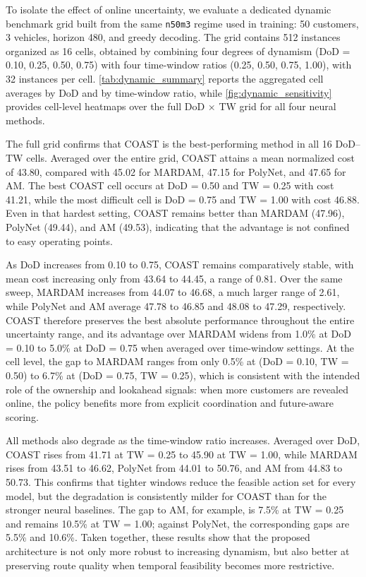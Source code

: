 \documentclass[conference]{IEEEtran}
\begin{document}
To isolate the effect of online uncertainty, we evaluate a dedicated dynamic benchmark grid built from the same \texttt{n50m3} regime used in training: 50 customers, 3 vehicles, horizon 480, and greedy decoding. The grid contains 512 instances organized as 16 cells, obtained by combining four degrees of dynamism (DoD = 0.10, 0.25, 0.50, 0.75) with four time-window ratios (0.25, 0.50, 0.75, 1.00), with 32 instances per cell. \autoref{tab:dynamic_summary} reports the aggregated cell averages by DoD and by time-window ratio, while \autoref{fig:dynamic_sensitivity} provides cell-level heatmaps over the full DoD $\times$ TW grid for all four neural methods.

The full grid confirms that COAST is the best-performing method in all 16 DoD--TW cells. Averaged over the entire grid, COAST attains a mean normalized cost of 43.80, compared with 45.02 for MARDAM, 47.15 for PolyNet, and 47.65 for AM. The best COAST cell occurs at DoD = 0.50 and TW = 0.25 with cost 41.21, while the most difficult cell is DoD = 0.75 and TW = 1.00 with cost 46.88. Even in that hardest setting, COAST remains better than MARDAM (47.96), PolyNet (49.44), and AM (49.53), indicating that the advantage is not confined to easy operating points.

As DoD increases from 0.10 to 0.75, COAST remains comparatively stable, with mean cost increasing only from 43.64 to 44.45, a range of 0.81. Over the same sweep, MARDAM increases from 44.07 to 46.68, a much larger range of 2.61, while PolyNet and AM average 47.78 to 46.85 and 48.08 to 47.29, respectively. COAST therefore preserves the best absolute performance throughout the entire uncertainty range, and its advantage over MARDAM widens from 1.0\% at DoD = 0.10 to 5.0\% at DoD = 0.75 when averaged over time-window settings. At the cell level, the gap to MARDAM ranges from only 0.5\% at (DoD = 0.10, TW = 0.50) to 6.7\% at (DoD = 0.75, TW = 0.25), which is consistent with the intended role of the ownership and lookahead signals: when more customers are revealed online, the policy benefits more from explicit coordination and future-aware scoring.

All methods also degrade as the time-window ratio increases. Averaged over DoD, COAST rises from 41.71 at TW = 0.25 to 45.90 at TW = 1.00, while MARDAM rises from 43.51 to 46.62, PolyNet from 44.01 to 50.76, and AM from 44.83 to 50.73. This confirms that tighter windows reduce the feasible action set for every model, but the degradation is consistently milder for COAST than for the stronger neural baselines. The gap to AM, for example, is 7.5\% at TW = 0.25 and remains 10.5\% at TW = 1.00; against PolyNet, the corresponding gaps are 5.5\% and 10.6\%. Taken together, these results show that the proposed architecture is not only more robust to increasing dynamism, but also better at preserving route quality when temporal feasibility becomes more restrictive.
\end{document}
